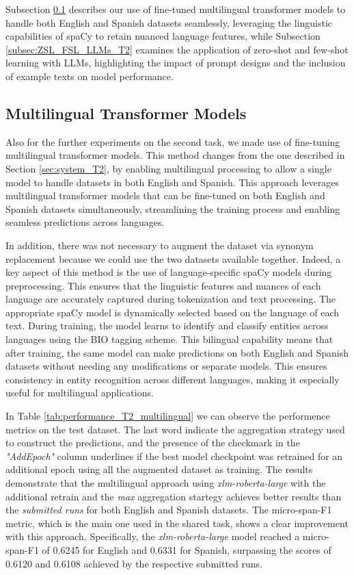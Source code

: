 \documentclass{Configuration_Files/PoliMi3i_thesis}
\begin{document}
Subsection \ref{subsec:multilingual_models_T2} describes our use of fine-tuned multilingual transformer models to handle both English and Spanish datasets seamlessly, leveraging the linguistic capabilities of spaCy to retain nuanced language features, while Subsection \ref{subsec:ZSL_FSL_LLMs_T2} examines the application of zero-shot and few-shot learning with LLMs, highlighting the impact of prompt designs and the inclusion of example texts on model performance.

\subsection{Multilingual Transformer Models} \label{subsec:multilingual_models_T2}
Also for the further experiments on the second task, we made use of fine-tuning multilingual transformer models. This method changes from the one described in Section \ref{sec:system_T2}, by enabling multilingual processing to allow a single model to handle datasets in both English and Spanish. This approach leverages multilingual transformer models that can be fine-tuned on both English and Spanish datasets simultaneously, streamlining the training process and enabling seamless predictions across languages. 

In addition, there was not necessary to augment the dataset via synonym replacement because we could use the two datasets available together. Indeed, a key aspect of this method is the use of language-specific spaCy models during preprocessing. This ensures that the linguistic features and nuances of each language are accurately captured during tokenization and text processing. The appropriate spaCy model is dynamically selected based on the language of each text. During training, the model learns to identify and classify entities across languages using the BIO tagging scheme. This bilingual capability means that after training, the same model can make predictions on both English and Spanish datasets without needing any modifications or separate models. This ensures consistency in entity recognition across different languages, making it especially useful for multilingual applications. 

In Table \ref{tab:performance_T2_multilingual} we can observe the performence metrics on the test dataset. The last word indicate the aggregation strategy used to construct the predictions, and the presence of the checkmark in the \textit{"AddEpoch"} column underlines if the best model checkpoint was retrained for an additional epoch using all the augmented dataset as training. The results demonstrate that the multilingual approach using \textit{xlm-roberta-large} with the additional retrain and the \textit{max} aggregation startegy achieves better results than the \textit{submitted runs} for both English and Spanish datasets. The micro-span-F1 metric, which is the main one used in the shared task, shows a clear improvement with this approach. Specifically, the \textit{xlm-roberta-large} model reached a micro-span-F1 of 0.6245 for English and 0.6331 for Spanish, surpassing the scores of 0.6120 and 0.6108 achieved by the respective submitted runs.
\end{document}
